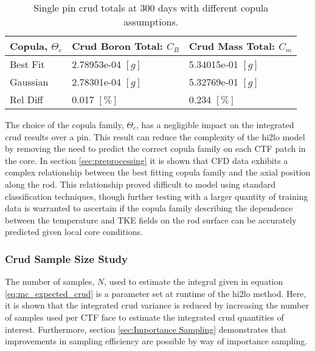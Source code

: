 \begin{table}[h]
    \begin{center}
        \caption[Crud totals with different copula assumptions.]{Single pin crud totals at 300 days with different copula assumptions.}
        \begin{tabular}[h]{|l | l | l |}
            \hline
            Copula, $\Theta_c$ & Crud Boron Total: $C_B$ & Crud Mass Total: $C_m$ \\
            \hline  \hline
            Best Fit &  2.78953e-04 $[g]$ & 5.34015e-01 $[g]$ \\
            Gaussian &  2.78301e-04 $[g]$ & 5.32769e-01 $[g]$ \\
            \hline
            Rel Diff &  0.017 $[\%]$ & 0.234 $[\%]$ \\
            \hline
        \end{tabular}
        \label{tab:crud_totals_copula}
    \end{center}
\end{table}

The choice of the copula family, $\Theta_c$, has a negligible impact on the integrated crud results over a pin.  This result can reduce the complexity of the hi2lo model by removing the need to predict the correct copula family on each CTF patch in the core.  In section \ref{sec:preprocessing} it is shown that CFD data exhibits a complex relationship between the best fitting copula family and the axial position along the rod.  This relationship proved difficult to model using standard classification techniques, though further testing with a larger quantity of training data is warranted to ascertain if the copula family describing the dependence between the temperature and TKE fields on the rod surface can be accurately predicted given local core conditions.

\subsubsection{Crud Sample Size Study}

The number of samples, $N$, used to estimate the integral given in equation \ref{eq:mc_expected_crud} is a parameter set at runtime of the hi2lo method.  Here, it is shown that the integrated crud variance is reduced by increasing the number of samples used per CTF face to estimate the integrated crud quantities of interest.   Furthermore, section \ref{sec:Importance Sampling} demonstrates that improvements in sampling efficiency are possible by way of importance sampling.

